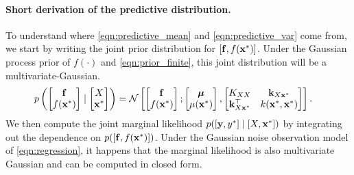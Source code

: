 \paragraph{Short derivation of the predictive distribution.}
To understand where \cref{eqn:predictive_mean} and \cref{eqn:predictive_var} come from, we start by writing the joint prior distribution for $[\mathbf{f}, f(\mathbf{x}^*)]$.
Under the Gaussian process prior of $f(\cdot)$ and \cref{eqn:prior_finite}, this joint distribution will be a multivariate-Gaussian.
%
\begin{align*}
  p \left(
    \begin{bmatrix} \bfn \\ f(\bxtest) \end{bmatrix} \mid
    \begin{bmatrix} \bX \\ \bxtest \end{bmatrix}
  \right)
  &= \normaldist{
    \begin{bmatrix} \bfn \\ f(\bxtest) \end{bmatrix} ;
    \begin{bmatrix} \bmu \\ \mu(\bxtest) \end{bmatrix}
  }{
    \begin{bmatrix}
      \bK_{\bX \bX}    & \bk_{\bX \bxtest} \\
      \bk_{\bX \bxtest}^\top   & k(\bxtest, \bxtest)
    \end{bmatrix}
  }.
\end{align*}
%
We then compute the joint marginal likelihood $p( [ \mathbf{y}, y^* ] \mid [ X, \mathbf{x}^* ] )$ by integrating out the dependence on $p( [\mathbf{f}, f(\mathbf{x}^*)] )$.
Under the Gaussian noise observation model of \cref{eqn:regression}, it happens that the marginal likelihood is also multivariate Gaussian and can be computed in closed form.
%
